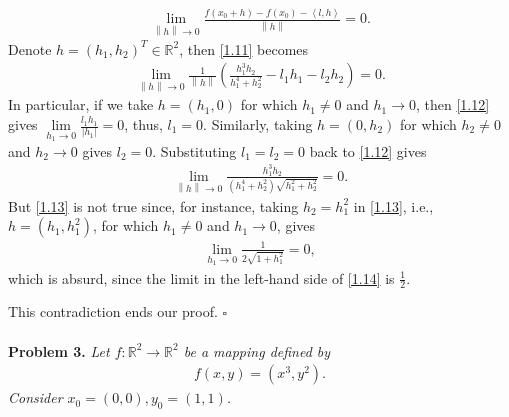 \documentclass[a4paper]{article}
\numberwithin{equation}{section}
\begin{document}
\begin{enumerate}
\begin{align}
\label{1.11}
\mathop {\lim }\limits_{\left\| h \right\| \to 0} \frac{{f\left( {{x_0} + h} \right) - f\left( {{x_0}} \right) - \left\langle {l,h} \right\rangle }}{{\left\| h \right\|}} = 0.
\end{align}
Denote $h=\left(h_1,h_2\right)^T \in \mathbb{R}^2$, then \eqref{1.11} becomes
\begin{align}
\label{1.12}
\mathop {\lim }\limits_{\left\| h \right\| \to 0} \frac{1}{{\left\| h \right\|}}\left( {\frac{{h_1^3{h_2}}}{{h_1^4 + h_2^2}} - {l_1}{h_1} - {l_2}{h_2}} \right) = 0.
\end{align}
In particular, if we take $h=\left(h_1,0\right)$ for which $h_1\ne 0$ and $h_1\to 0$, then \eqref{1.12} gives $\mathop {\lim }\limits_{{h_1} \to 0} \frac{{{l_1}{h_1}}}{{\left| {{h_1}} \right|}} = 0$, thus, $l_1=0$. Similarly, taking $h=\left(0,h_2\right)$ for which $h_2\ne 0$ and $h_2\to 0$ gives $l_2 =0$. Substituting $l_1=l_2=0$ back to \eqref{1.12} gives
\begin{align}
\label{1.13}
\mathop {\lim }\limits_{\left\| h \right\| \to 0} \frac{{h_1^3{h_2}}}{{\left( {h_1^4 + h_2^2} \right)\sqrt {h_1^2 + h_2^2} }} = 0.
\end{align}
But \eqref{1.13} is not true since, for instance, taking $h_2=h_1^2$ in \eqref{1.13}, i.e., $h = \left( {{h_1},h_1^2} \right)$, for which $h_1\ne 0$ and $h_1\to 0$, gives
\begin{align}
\label{1.14}
\mathop {\lim }\limits_{{h_1} \to 0} \frac{1}{{2\sqrt {1 + h_1^2} }} = 0, 
\end{align}
which is absurd, since the limit in the left-hand side of \eqref{1.14} is $\frac{1}{2}$. 
\end{enumerate}
This contradiction ends our proof. \hfill $\square$\\
\\
\textbf{Problem 3.} \textit{Let $f:\mathbb{R}^2\to \mathbb{R}^2$ be a mapping defined by}
\begin{align}
f\left( {x,y} \right) = \left( {{x^3},{y^2}} \right).
\end{align}
\textit{Consider $x_0=\left(0,0\right), y_0=\left(1,1\right)$.}
\end{document}
